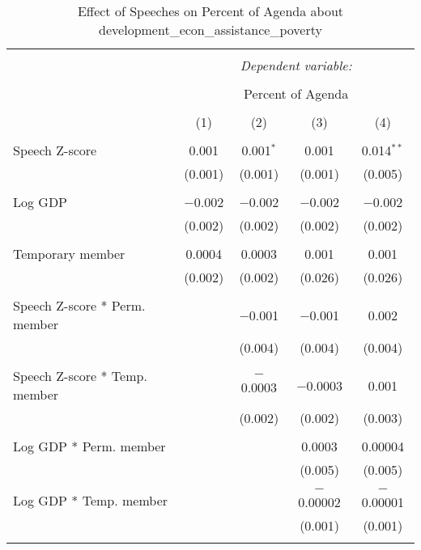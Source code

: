 
\begin{table}[!htbp] \centering 
  \caption{Effect of Speeches on Percent of Agenda about development_econ_assistance_poverty} 
  \label{} 
\begin{tabular}{@{\extracolsep{5pt}}lcccc} 
\\[-1.8ex]\hline 
\hline \\[-1.8ex] 
 & \multicolumn{4}{c}{\textit{Dependent variable:}} \\ 
\cline{2-5} 
\\[-1.8ex] & \multicolumn{4}{c}{Percent of Agenda} \\ 
\\[-1.8ex] & (1) & (2) & (3) & (4)\\ 
\hline \\[-1.8ex] 
 Speech Z-score & 0.001 & 0.001$^{*}$ & 0.001 & 0.014$^{**}$ \\ 
  & (0.001) & (0.001) & (0.001) & (0.005) \\ 
  & & & & \\ 
 Log GDP & $-$0.002 & $-$0.002 & $-$0.002 & $-$0.002 \\ 
  & (0.002) & (0.002) & (0.002) & (0.002) \\ 
  & & & & \\ 
 Temporary member & 0.0004 & 0.0003 & 0.001 & 0.001 \\ 
  & (0.002) & (0.002) & (0.026) & (0.026) \\ 
  & & & & \\ 
 Speech Z-score * Perm. member &  & $-$0.001 & $-$0.001 & 0.002 \\ 
  &  & (0.004) & (0.004) & (0.004) \\ 
  & & & & \\ 
 Speech Z-score * Temp. member &  & $-$0.0003 & $-$0.0003 & 0.001 \\ 
  &  & (0.002) & (0.002) & (0.003) \\ 
  & & & & \\ 
 Log GDP * Perm. member &  &  & 0.0003 & 0.00004 \\ 
  &  &  & (0.005) & (0.005) \\ 
  & & & & \\ 
 Log GDP * Temp. member &  &  & $-$0.00002 & $-$0.00001 \\ 
  &  &  & (0.001) & (0.001) \\ 
  & & & & \\ 

\end{tabular}
\end{table}
